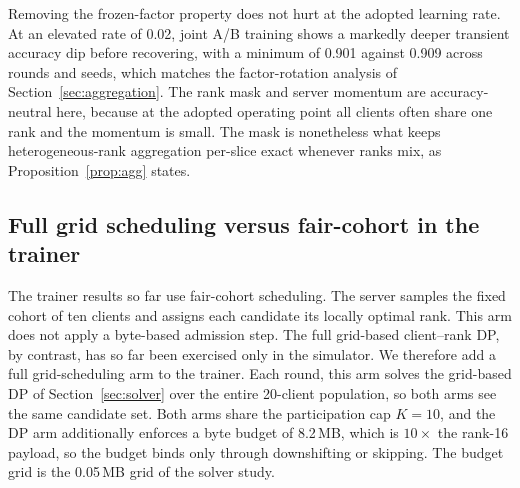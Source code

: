 \documentclass[preprint,12pt]{elsarticle}
\begin{document}
Removing the frozen-factor property does not hurt at the adopted learning rate. At an elevated rate of 0.02, joint A/B training shows a markedly deeper transient accuracy dip before recovering, with a minimum of 0.901 against 0.909 across rounds and seeds, which matches the factor-rotation analysis of Section~\ref{sec:aggregation}. The rank mask and server momentum are accuracy-neutral here, because at the adopted operating point all clients often share one rank and the momentum is small. The mask is nonetheless what keeps heterogeneous-rank aggregation per-slice exact whenever ranks mix, as Proposition~\ref{prop:agg} states.

\subsection{Full grid scheduling versus fair-cohort in the trainer}
\label{sec:dpvfair}
The trainer results so far use fair-cohort scheduling. The server samples the fixed cohort of ten clients and assigns each candidate its locally optimal rank. This arm does not apply a byte-based admission step. The full grid-based client--rank DP, by contrast, has so far been exercised only in the simulator. We therefore add a full grid-scheduling arm to the trainer. Each round, this arm solves the grid-based DP of Section~\ref{sec:solver} over the entire 20-client population, so both arms see the same candidate set. Both arms share the participation cap $K{=}10$, and the DP arm additionally enforces a byte budget of 8.2\,MB, which is $10\times$ the rank-16 payload, so the budget binds only through downshifting or skipping. The budget grid is the 0.05\,MB grid of the solver study.

\begin{table}[H]
\centering
\caption{Full grid scheduling versus fair-cohort in the real trainer on non-IID CIFAR-10 with a nominal deadline and ten seeds. Accuracy is measured at round 40 and network metrics are averaged over rounds 30--39. Both arms share all 20 clients and the participation cap $K{=}10$. The DP arm additionally enforces an 8.2\,MB byte budget.}
\label{tab:dpvfair}
\end{table}
\end{document}

